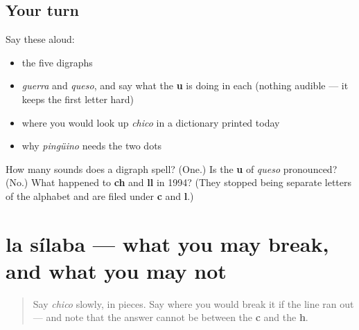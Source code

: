 \subsection*{Your turn}
Say these aloud:

\begin{itemize}
\raggedright
  \item the five digraphs
  \item \emph{guerra} and \emph{queso}, and say what the \textbf{u} is doing in each (nothing audible — it keeps the first letter hard)
  \item where you would look up \emph{chico} in a dictionary printed today
  \item why \emph{pingüino} needs the two dots
\end{itemize}

\begin{tcolorbox}[breakable,colback=teal!4,colframe=teal!35!black,title={Before you move on}]
How many sounds does a digraph spell? (One.) Is the \textbf{u} of \emph{queso} pronounced? (No.) What happened to \textbf{ch} and \textbf{ll} in 1994? (They stopped being separate letters of the alphabet and are filed under \textbf{c} and \textbf{l}.)
\end{tcolorbox}
\section[la sílaba]{la sílaba — what you may break, and what you may not}

\label{lesson:ES-C425-silabas}



\begin{quote}
Say \emph{chico} slowly, in pieces. Say where you would break it if the line ran out — and note that the answer cannot be between the \textbf{c} and the \textbf{h}.
\end{quote}

